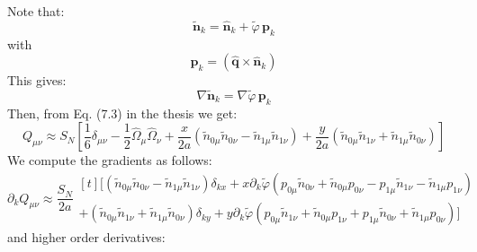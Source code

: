 \documentclass[reqno]{article}
\newcommand{\phitilde}{\tilde{\varphi}}
\newcommand{\ntilde}{\tilde{\mathbf{n}}}
\begin{document}
Note that:
\begin{equation}
    \ntilde_k 
    = 
    \mathbf{\hat{n}}_k + \phitilde \, \mathbf{p}_k
\end{equation}
with
\begin{equation}
    \mathbf{p}_k
    =
    \left( \mathbf{\hat{q}} \times \mathbf{\hat{n}}_k \right)
\end{equation}
This gives:
\begin{equation}
    \nabla \ntilde_k 
    = 
    \nabla \phitilde \, \mathbf{p}_k
\end{equation}
Then, from Eq. (7.3) in the thesis we get:
\begin{equation}
    Q_{\mu \nu}
    \approx
    S_N \left[
        \frac16 \delta_{\mu \nu}
        - \frac12 \hat{\Omega}_{\mu} \hat{\Omega}_{\nu}
        + \frac{x}{2 a} \left( \tilde{n}_{0\mu} \tilde{n}_{0\nu} - \tilde{n}_{1\mu} \tilde{n}_{1\nu} \right)
        + \frac{y}{2 a} \left( \tilde{n}_{0\mu} \tilde{n}_{1\nu} + \tilde{n}_{1\mu} \tilde{n}_{0\nu} \right)
    \right]
\end{equation}
We compute the gradients as follows:
\begin{equation}
    \partial_k Q_{\mu \nu}
    \approx
    \frac{S_N}{2a}
    \begin{multlined}[t]
    \biggl[
        \left( \tilde{n}_{0\mu} \tilde{n}_{0\nu} - \tilde{n}_{1\mu} \tilde{n}_{1\nu} \right)\delta_{k x} 
        + x \partial_k \phitilde \left( 
            p_{0\mu} \tilde{n}_{0\nu} + \tilde{n}_{0\mu} p_{0\nu} - p_{1\mu} \tilde{n}_{1\nu} - \tilde{n}_{1\mu} p_{1\nu}
        \right) \\
        + \left( \tilde{n}_{0\mu} \tilde{n}_{1\nu} + \tilde{n}_{1\mu} \tilde{n}_{0\nu} \right) \delta_{k y}
        + y \partial_k \phitilde \left( p_{0\mu} \tilde{n}_{1\nu} + \tilde{n}_{0\mu} p_{1\nu} + p_{1\mu} \tilde{n}_{0\nu} + \tilde{n}_{1\mu} p_{0\nu}\right)
    \biggr]
    \end{multlined}
\end{equation}
and higher order derivatives:
\end{document}
